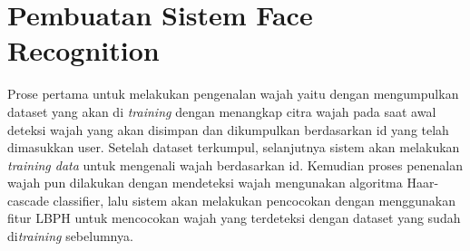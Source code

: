 \newpage
\section{Pembuatan Sistem Face Recognition}
Prose pertama untuk melakukan pengenalan wajah yaitu dengan mengumpulkan dataset yang akan di \emph{training} dengan menangkap citra wajah pada saat awal deteksi wajah yang akan 
disimpan dan dikumpulkan berdasarkan id yang telah dimasukkan user. Setelah dataset terkumpul, selanjutnya sistem akan melakukan \emph{training data} untuk mengenali wajah berdasarkan id. 
Kemudian proses penenalan wajah pun dilakukan dengan mendeteksi wajah mengunakan algoritma Haar-cascade classifier, lalu sistem akan melakukan pencocokan dengan menggunakan fitur LBPH 
untuk mencocokan wajah yang terdeteksi dengan dataset yang sudah di\emph{training} sebelumnya.


